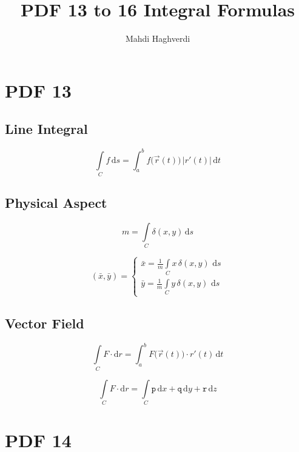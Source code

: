\documentclass[12pt, fleqn]{book}
\title{PDF 13 to 16 Integral Formulas}
\author{Mahdi Haghverdi}
\newcommand{\D}{\mathrm{d}}
\begin{document}
	\maketitle
	\tableofcontents
\chapter{PDF 13}\label{pdf13}
	\section{Line Integral}
	\begin{equation}
		\int\limits_C f \, \D s = \int_{a}^{b} f\big(\vec{r}(t)\big) \, \lvert r'(t) \lvert \, \D t
	\end{equation}		

	\section{Physical Aspect}
		\begin{equation}
			m = \int\limits_C \delta (x, y) \, \D s
		\end{equation}
		
		\begin{equation}
			(\bar{x}, \bar{y}) = 
			\begin{cases}
					\bar{x} = \frac{1}{m} \int\limits_C x \, \delta(x, y) \, \, \D s \\
					\bar{y} = \frac{1}{m} \int\limits_C y \, \delta(x, y) \, \, \D s
			\end{cases}
		\end{equation}
	
	\section{Vector Field}
		\begin{equation}
			\int\limits_C F \cdot \D r = \int_{a}^{b} F\big(\vec{r}(t)\big) \cdot r'(t) \, \D t
		\end{equation}
		
		\begin{equation}
			\int\limits_C F \cdot \D r = \int\limits_C \mathtt{p} \, \D x + \mathtt{q} \, \D y + \mathtt{r} \, \D z
		\end{equation}    









\chapter{PDF 14}\label{pdf14}
\end{document}
